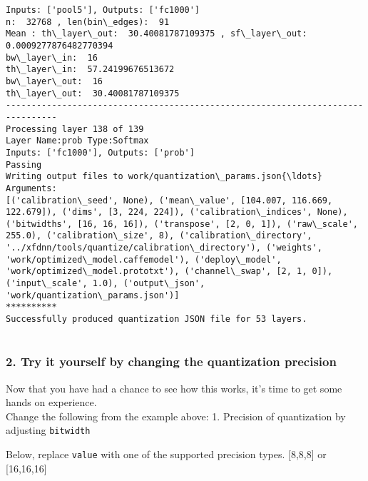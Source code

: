 \documentclass[11pt]{article}
\begin{document}
\begin{Verbatim}[commandchars=\\\{\}]
Inputs: ['pool5'], Outputs: ['fc1000']
n:  32768 , len(bin\_edges):  91
Mean : th\_layer\_out:  30.40081787109375 , sf\_layer\_out:  0.0009277876482770394
bw\_layer\_in:  16
th\_layer\_in:  57.24199676513672
bw\_layer\_out:  16
th\_layer\_out:  30.40081787109375
--------------------------------------------------------------------------------
Processing layer 138 of 139
Layer Name:prob Type:Softmax
Inputs: ['fc1000'], Outputs: ['prob']
Passing
Writing output files to work/quantization\_params.json{\ldots}
Arguments:
[('calibration\_seed', None), ('mean\_value', [104.007, 116.669, 122.679]), ('dims', [3, 224, 224]), ('calibration\_indices', None), ('bitwidths', [16, 16, 16]), ('transpose', [2, 0, 1]), ('raw\_scale', 255.0), ('calibration\_size', 8), ('calibration\_directory', '../xfdnn/tools/quantize/calibration\_directory'), ('weights', 'work/optimized\_model.caffemodel'), ('deploy\_model', 'work/optimized\_model.prototxt'), ('channel\_swap', [2, 1, 0]), ('input\_scale', 1.0), ('output\_json', 'work/quantization\_params.json')]
**********
Successfully produced quantization JSON file for 53 layers.


    \end{Verbatim}

    \subsubsection{2. Try it yourself by changing the quantization
precision}\label{try-it-yourself-by-changing-the-quantization-precision}

Now that you have had a chance to see how this works, it's time to get
some hands on experience.\\
Change the following from the example above: 1. Precision of
quantization by adjusting \texttt{bitwidth}

Below, replace \texttt{value} with one of the supported precision types.
{[}8,8,8{]} or {[}16,16,16{]}
\end{document}
